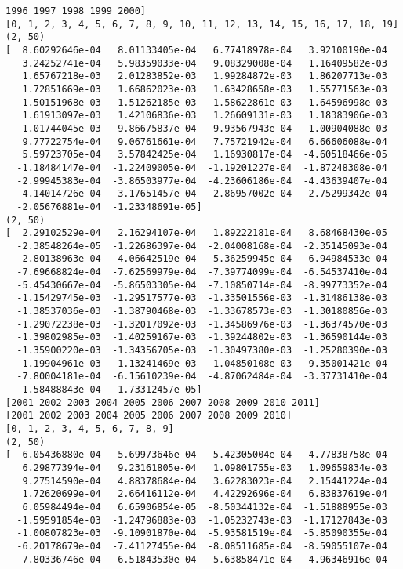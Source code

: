 \documentclass[11pt]{article}
\begin{document}
\begin{Verbatim}[commandchars=\\\{\}]
 1996 1997 1998 1999 2000]
[0, 1, 2, 3, 4, 5, 6, 7, 8, 9, 10, 11, 12, 13, 14, 15, 16, 17, 18, 19]
(2, 50)
[  8.60292646e-04   8.01133405e-04   6.77418978e-04   3.92100190e-04
   3.24252741e-04   5.98359033e-04   9.08329008e-04   1.16409582e-03
   1.65767218e-03   2.01283852e-03   1.99284872e-03   1.86207713e-03
   1.72851669e-03   1.66862023e-03   1.63428658e-03   1.55771563e-03
   1.50151968e-03   1.51262185e-03   1.58622861e-03   1.64596998e-03
   1.61913097e-03   1.42106836e-03   1.26609131e-03   1.18383906e-03
   1.01744045e-03   9.86675837e-04   9.93567943e-04   1.00904088e-03
   9.77722754e-04   9.06761661e-04   7.75721942e-04   6.66606088e-04
   5.59723705e-04   3.57842425e-04   1.16930817e-04  -4.60518466e-05
  -1.18484147e-04  -1.22409005e-04  -1.19201227e-04  -1.87248308e-04
  -2.99945383e-04  -3.86503977e-04  -4.23606186e-04  -4.43639407e-04
  -4.14014726e-04  -3.17651457e-04  -2.86957002e-04  -2.75299342e-04
  -2.05676881e-04  -1.23348691e-05]
(2, 50)
[  2.29102529e-04   2.16294107e-04   1.89222181e-04   8.68468430e-05
  -2.38548264e-05  -1.22686397e-04  -2.04008168e-04  -2.35145093e-04
  -2.80138963e-04  -4.06642519e-04  -5.36259945e-04  -6.94984533e-04
  -7.69668824e-04  -7.62569979e-04  -7.39774099e-04  -6.54537410e-04
  -5.45430667e-04  -5.86503305e-04  -7.10850714e-04  -8.99773352e-04
  -1.15429745e-03  -1.29517577e-03  -1.33501556e-03  -1.31486138e-03
  -1.38537036e-03  -1.38790468e-03  -1.33678573e-03  -1.30180856e-03
  -1.29072238e-03  -1.32017092e-03  -1.34586976e-03  -1.36374570e-03
  -1.39802985e-03  -1.40259167e-03  -1.39244802e-03  -1.36590144e-03
  -1.35900220e-03  -1.34356705e-03  -1.30497380e-03  -1.25280390e-03
  -1.19904961e-03  -1.13241469e-03  -1.04850108e-03  -9.35001421e-04
  -7.80004181e-04  -6.15610239e-04  -4.87062484e-04  -3.37731410e-04
  -1.58488843e-04  -1.73312457e-05]
[2001 2002 2003 2004 2005 2006 2007 2008 2009 2010 2011]
[2001 2002 2003 2004 2005 2006 2007 2008 2009 2010]
[0, 1, 2, 3, 4, 5, 6, 7, 8, 9]
(2, 50)
[  6.05436880e-04   5.69973646e-04   5.42305004e-04   4.77838758e-04
   6.29877394e-04   9.23161805e-04   1.09801755e-03   1.09659834e-03
   9.27514590e-04   4.88378684e-04   3.62283023e-04   2.15441224e-04
   1.72620699e-04   2.66416112e-04   4.42292696e-04   6.83837619e-04
   6.05984494e-04   6.65906854e-05  -8.50344132e-04  -1.51888955e-03
  -1.59591854e-03  -1.24796883e-03  -1.05232743e-03  -1.17127843e-03
  -1.00807823e-03  -9.10901870e-04  -5.93581519e-04  -5.85090355e-04
  -6.20178679e-04  -7.41127455e-04  -8.08511685e-04  -8.59055107e-04
  -7.80336746e-04  -6.51843530e-04  -5.63858471e-04  -4.96346916e-04

\end{Verbatim}
\end{document}
